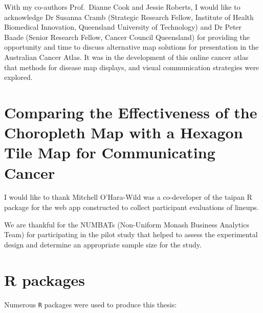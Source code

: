 \documentclass{monashthesis}
\begin{document}
With my co-authors Prof.~Dianne Cook and Jessie Roberts, I would like to acknowledge Dr Susanna Cramb (Strategic Research Fellow, Institute of Health Biomedical Innovation, Queensland University of Technology) and Dr Peter Baade (Senior Research Fellow, Cancer Council Queensland) for providing the opportunity and time to discuss alternative map solutions for presentation in the Australian Cancer Atlas.
It was in the development of this online cancer atlas that methods for disease map displays, and visual communication strategies were explored.

\hypertarget{comparing-the-effectiveness-of-the-choropleth-map-with-a-hexagon-tile-map-for-communicating-cancer}{%
\section*{Comparing the Effectiveness of the Choropleth Map with a Hexagon Tile Map for Communicating Cancer}\label{comparing-the-effectiveness-of-the-choropleth-map-with-a-hexagon-tile-map-for-communicating-cancer}}

I would like to thank Mitchell O'Hara-Wild was a co-developer of the taipan \autocite{taipan} R package for the web app constructed to collect participant evaluations of lineups.

We are thankful for the NUMBATs (Non-Uniform Monash Business Analytics Team) for participating in the pilot study that helped to assess the experimental design and determine an appropriate sample size for the study.

\hypertarget{r-packages}{%
\section*{R packages}\label{r-packages}}

Numerous \texttt{R} \autocite{R} packages were used to produce this thesis:
\end{document}
